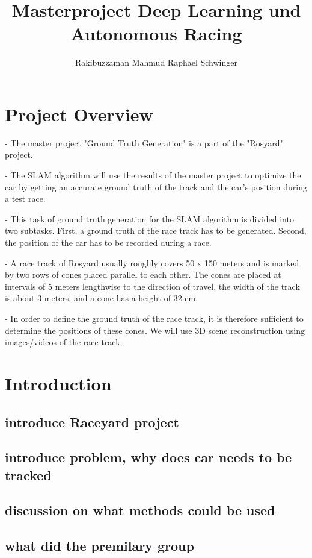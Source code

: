 \documentclass{article}
\title{Masterproject Deep Learning und Autonomous Racing
}
\author{Rakibuzzaman Mahmud
Raphael Schwinger}
\begin{document}
\maketitle


\section{Project Overview}

- The master project "Ground Truth Generation"  is a part of the "Rosyard" project. 

- The SLAM algorithm will use the results of the master project to optimize the car by getting an accurate ground truth of the track and the car's position during a test race.

- This task of ground truth generation for the SLAM algorithm is divided into two subtasks. First, a ground truth of the race track has to be generated.  Second, the position of the car has to be recorded during a race. 


- A race track of Rosyard usually roughly covers 50 x 150 meters and is marked by two rows of cones placed parallel to each other. The cones are placed at intervals of 5 meters lengthwise to the direction of travel, the width of the track is about 3 meters, and a cone has a height of 32 cm. 

- In order to define the ground truth of the race track, it is therefore sufficient to determine the positions of these cones. We will use  3D scene reconstruction using images/videos of the race track. 



\section{Introduction}

\subsection{introduce Raceyard project}
\subsection{introduce problem, why does car needs to be tracked}
\subsection{discussion on what methods could be used}
\subsection{what did the premilary group}
\end{document}
